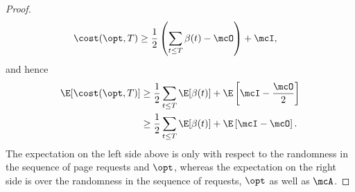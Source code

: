 \documentclass[11pt]{article}
\begin{document}
\begin{proof}
    \begin{align}
        \cost(\opt, T) &\ge \frac{1}{2}\left(\sum_{t \le T}\beta(t) - \mcO \right) + \mcI, \label{eqn:lpr-final-accounting}
    \end{align}
    and hence
    \begin{align*}
        \E[\cost(\opt, T)] &\ge \frac{1}{2}\sum_{t \le T}\E[\beta(t)] + \E\left[\mcI - \frac{\mcO}{2}\right] \\
        &\ge \frac{1}{2}\sum_{t \le T}\E[\beta(t)] + \E\left[\mcI - \mcO\right].
    \end{align*}
    The expectation on the left side above is only with respect to the randomness in the sequence of page requests and $\opt$, whereas the expectation on the right side is over the randomness in the sequence of requests, $\opt$ as well as $\mcA$. 
    

\end{proof}
\end{document}
